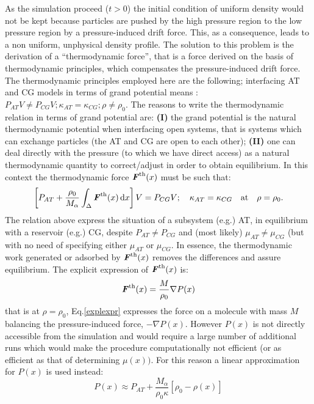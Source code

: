\documentclass[aps,pre,preprint]{revtex4}
\renewcommand{\v}[1]{\textbf{\textit{#1}}}
\begin{document}
As the simulation proceed ($t>0$) the initial condition of uniform density would not be kept because particles are pushed by the high pressure region to the low pressure region by a pressure-induced drift force. This, as a consequence, leads to a non uniform, unphysical density profile. The solution to this problem is the derivation of a ``thermodynamic force'', that is a force derived on the basis of thermodynamic principles, which compensates the pressure-induced drift force. The thermodynamic principles employed here are the following; interfacing AT and CG models in terms of grand potential means :$P_{AT}V\neq P_{CG}V; \kappa_{AT} =  \kappa_{CG}; \rho\neq \rho_{0}$. The reasons to write the thermodynamic relation in terms of grand potential are: {\bf (I)}  the grand potential is the natural thermodynamic potential when interfacing open systems, that is systems which can exchange particles (the AT and CG are open to each other); {\bf (II)} one can deal directly with the pressure (to which we have direct access) as a natural thermodynamic quantity to correct/adjust in order to obtain equilibrium. In this context the thermodynamic force ${\v F}^{\textrm{th}}(x)$ must be such that: 
\begin{equation}
\left[P_{AT}+ \frac{\rho_{0}}{M_\alpha}\int_{\Delta} {\v F}^\text{th}(x)\,\text{d}x\right] V =P_{CG}V; \quad\kappa_{AT} =  \kappa_{CG}\quad \text{at}\quad\rho=\rho_{0}.
\label{thf}
\end{equation}
The relation above express the situation of a subsystem (e.g.) AT, in equilibrium with a reservoir (e.g.) CG, despite $P_{AT}\neq P_{CG}$ and
(most likely) $\mu_{AT}\neq\mu_{CG}$ (but with no need of specifying either $\mu_{AT}$ or $\mu_{CG}$. In essence, the thermodynamic work generated or adsorbed by ${\v F}^{\textrm{th}}(x)$ removes the differences and assure equilibrium. The explicit expression of ${\v F}^{\textrm{th}}(x)$ is:
\begin{equation}
{\v F}^{\textrm{th}}(x)=\frac{M}{\rho_{0}}\nabla P(x)
\label{explexpr}
\end{equation}
that is at $\rho=\rho_{0}$, Eq.\ref{explexpr} expresses the force on a molecule with mass $M$ balancing the pressure-induced force, $-\nabla P(x)$.
However $P(x)$ is not directly accessible from the simulation and would require a large number of additional runs which would make the procedure computationally not efficient (or as efficient as that of determining $\mu(x))$. For this reason a linear approximation for $P(x)$ is used instead:
\begin{equation}
P(x)\approx P_{AT}+\frac{M_{\alpha}}{\rho_{0}\kappa}[\rho_{0}-\rho(x)]
\label{linearapp}
\end{equation}
\end{document}
